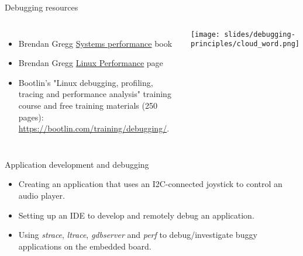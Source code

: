 \begin{frame}{Debugging resources}
  \begin{columns}[T]
  \begin{itemize}
  \item Brendan Gregg
    \href{https://www.brendangregg.com/systems-performance-2nd-edition-book.html}{Systems
      performance} book
  \item Brendan Gregg
    \href{https://www.brendangregg.com/linuxperf.html}{Linux
      Performance} page
  \item Bootlin's "Linux debugging, profiling, tracing and performance
        analysis" training course and free training materials
        (250 pages): \url{https://bootlin.com/training/debugging/}.
  \end{itemize}
  \texttt{[image: slides/debugging-principles/cloud\_word.png]}
  \end{columns}
\end{frame}

\setuplabframe
{Application development and debugging}
{
  \begin{itemize}
  \item Creating an application that uses an I2C-connected joystick to
    control an audio player.
  \item Setting up an IDE to develop and remotely debug an
    application.
  \item Using {\em strace}, {\em ltrace}, {\em gdbserver} and {\em
      perf} to debug/investigate buggy applications on the embedded
    board.
  \end{itemize}
}
